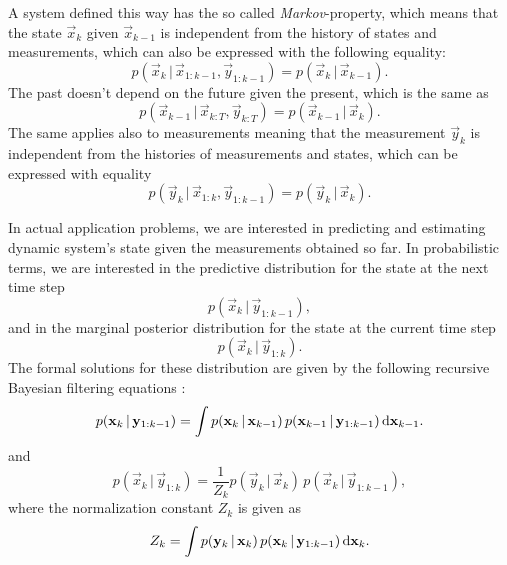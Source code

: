 A system defined this way has the so called \emph{Markov}-property,
which means that the state $\vec{x}_k$ given $\vec{x}_{k-1}$ is
independent from the history of states and measurements, which can
also be expressed with the following equality:
%
\begin{equation} p(\vec{x}_k\,|\,\vec{x}_{1:k-1},\vec{y}_{1:k-1}) =
p(\vec{x}_k\,|\,\vec{x}_{k-1}).
\end{equation}
%
The past doesn't depend on the future given the present, which is the
same as
%
\begin{equation} p(\vec{x}_{k-1}\,|\,\vec{x}_{k:T},\vec{y}_{k:T}) =
p(\vec{x}_{k-1}\,|\,\vec{x}_{k}).
\end{equation}
% 
The same applies also to measurements meaning that the measurement
$\vec{y}_k$ is independent from the histories of measurements and
states, which can be expressed with equality
%
\begin{equation} p(\vec{y}_k\,|\,\vec{x}_{1:k},\vec{y}_{1:k-1}) =
p(\vec{y}_k\,|\,\vec{x}_{k}).
\end{equation}


In actual application problems, we are interested in predicting and
estimating dynamic system's state given the measurements obtained so
far. In probabilistic terms, we are interested in the predictive
distribution for the state at the next time step
%
\begin{equation} p(\vec{x}_{k}\,|\,\vec{y}_{1:k-1}),
\end{equation}
%
and in the marginal posterior distribution for the state at the
current time step
%
\begin{equation} p(\vec{x}_{k}\,|\,\vec{y}_{1:k}).
\end{equation}
%
The formal solutions for these distribution are given by the following
recursive Bayesian filtering equations  \citep[e.g.][]{Sarkka:2006b}:
%
\begin{equation} p(\mathbf{x}_k\,|\,\mathbf{y}_{1:k-1}) = \int
p(\mathbf{x}_k\,|\,\mathbf{x}_{k-1}) \, p(\mathbf{x}_{k-1}\,|\,\mathbf{y}_{1:k-1})
\, \mathrm{d}\mathbf{x}_{k-1}.
\label{eq:bayesf_p}
\end{equation} and
\begin{equation} p(\vec{x}_k\,|\,\vec{y}_{1:k}) = \frac{1}{Z_k}
p(\vec{y}_k\,|\,\vec{x}_k) \, p(\vec{x}_k\,|\,\vec{y}_{1:k-1}),
\label{eq:bayesf_u}
\end{equation} where the normalization constant $Z_k$ is given as
\begin{equation} Z_k = \int p(\mathbf{y}_k\,|\,\mathbf{x}_k) \,
p(\mathbf{x}_k\,|\,\mathbf{y}_{1:k-1}) \, \mathrm{d}\mathbf{x}_k.
\label{eq:zk}
\end{equation}
%

